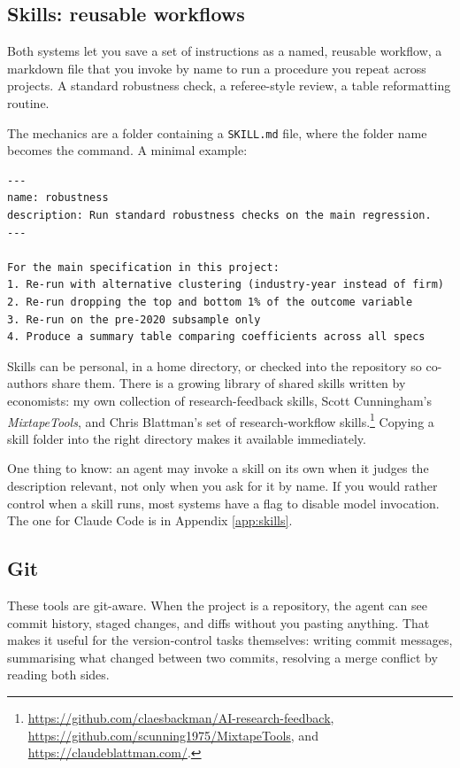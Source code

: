 \documentclass[11pt,a4paper]{article}
\newcommand{\code}[1]{\texttt{\small #1}}
\begin{document}
\subsection{Skills: reusable workflows}

Both systems let you save a set of instructions as a named, reusable workflow, a markdown file that
you invoke by name to run a procedure you repeat across
projects. A standard robustness check, a referee-style review, a table
reformatting routine.

The mechanics are a folder containing a \code{SKILL.md} file, where the folder
name becomes the command. A minimal example:

\begin{promptbox}
\begin{Verbatim}[breaklines,fontsize=\small]
---
name: robustness
description: Run standard robustness checks on the main regression.
---

For the main specification in this project:
1. Re-run with alternative clustering (industry-year instead of firm)
2. Re-run dropping the top and bottom 1% of the outcome variable
3. Re-run on the pre-2020 subsample only
4. Produce a summary table comparing coefficients across all specs
\end{Verbatim}
\end{promptbox}

Skills can be personal, in a home directory, or checked into the repository so
co-authors share them. There is a growing library of shared skills written by
economists: my own collection of research-feedback skills, Scott Cunningham's
\emph{MixtapeTools}, and Chris Blattman's set of research-workflow
skills.\footnote{\url{https://github.com/claesbackman/AI-research-feedback},
\url{https://github.com/scunning1975/MixtapeTools}, and
\url{https://claudeblattman.com/}.} Copying a skill folder into the right
directory makes it available immediately.

One thing to know: an agent may invoke a skill on its own when it judges the
description relevant, not only when you ask for it by name. If you would rather
control when a skill runs, most systems have a flag to disable model invocation.
The one for Claude Code is in Appendix \ref{app:skills}.

\subsection{Git}
\label{sec:git}

These tools are git-aware. When the project is a repository, the agent can see
commit history, staged changes, and diffs without you pasting anything. That
makes it useful for the version-control tasks themselves: writing commit
messages, summarising what changed between two commits, resolving a merge
conflict by reading both sides.
\end{document}
